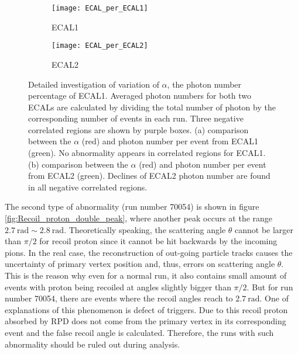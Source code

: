 \begin{figure*}[!h]
	\centering
	\vspace{1cm}
	\begin{subfigure}{\textwidth}
		\texttt{[image: ECAL\_per\_ECAL1]}
		\caption{ECAL1}
		\label{fig:ECAL_per_ECAL1}
		\vspace{1cm}
	\end{subfigure}
	\begin{subfigure}{\textwidth}
		\texttt{[image: ECAL\_per\_ECAL2]}
		\caption{ECAL2}
		\label{fig:ECAL_per_ECAL2}
	\end{subfigure}
	\caption{Detailed investigation of variation of $\alpha$, the photon number percentage of ECAL1. Averaged photon numbers for both two ECALs are calculated by dividing the total number of photon by the corresponding number of events in each run. Three negative correlated regions are shown by purple boxes. (a) comparison between the $\alpha$ (red) and photon number per event from ECAL1 (green). No abnormality appears in correlated regions for ECAL1. (b) comparison between the $\alpha$ (red) and photon number per event from ECAL2 (green). Declines of ECAL2 photon number are found in all negative correlated regions.}
	\label{fig:ECAL_per_ECAL}
	\vspace{1cm}
\end{figure*}

The second type of abnormality (run number 70054) is shown in figure \ref{fig:Recoil_proton_double_peak}, where another peak occurs at the range $\SI{2.7}{\radian} \sim \SI{2.8}{\radian}$. Theoretically speaking, the scattering angle $\theta$ cannot be larger than $\pi/2$ for recoil proton since it cannot be hit backwards by the incoming pions. In the real case, the reconstruction of out-going particle tracks causes the uncertainty of primary vertex position and, thus, errors on scattering angle $\theta$. This is the reason why even for a normal run, it also contains small amount of events with proton being recoiled at angles slightly bigger than $\pi/2$. But for run number 70054, there are events where the recoil angles reach to $\SI{2.7}{\radian}$. One of explanations of this phenomenon is defect of triggers. Due to this recoil proton absorbed by RPD does not come from the primary vertex in its corresponding event and the false recoil angle is calculated. Therefore, the runs with such abnormality should be ruled out during analysis.





